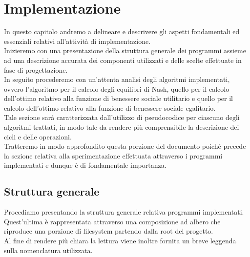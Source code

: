 \chapter{Implementazione}
\justify
In questo capitolo andremo a delineare e descrivere gli aspetti fondamentali ed essenziali relativi all'attività di implementazione.\\

Inizieremo con una presentazione della struttura generale dei programmi assieme ad una descrizione accurata dei componenti utilizzati e delle scelte effettuate in fase di progettazione.\\

In seguito procederemo con un'attenta analisi degli algoritmi implementati, ovvero l'algoritmo per il calcolo degli equilibri di Nash, quello per il calcolo dell'ottimo relativo alla funzione di benessere sociale utilitario e quello per il calcolo dell'ottimo relativo alla funzione di benessere sociale egalitario.\\
Tale sezione sarà caratterizzata dall'utilizzo di pseudocodice per ciascuno degli algoritmi trattati, in modo tale da rendere più comprensibile la descrizione dei cicli e delle operazioni.\\

Tratteremo in modo approfondito questa porzione del documento poiché precede la sezione relativa alla sperimentazione effettuata attraverso i programmi implementati e dunque è di fondamentale importanza.\\

\section{Struttura generale}
\justify

Procediamo presentando la struttura generale relativa programmi implementati.\\ 
Quest'ultima è rappresentata attraverso una composizione ad albero che riproduce una porzione di filesystem partendo dalla root del progetto.\\
Al fine di rendere più chiara la lettura viene inoltre fornita un breve leggenda sulla nomenclatura utilizzata.

